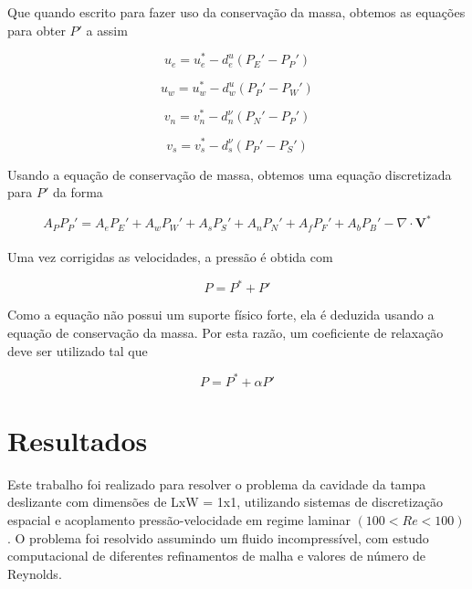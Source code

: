 \documentclass[]{article}
\begin{document}
Que quando escrito para fazer uso da conservação da massa, obtemos as equações para obter $P'$ a assim

\begin{equation}
	u_e = u_e^* - d_e^u \left( P_E' - P_P' \right)
\end{equation}

\begin{equation}
	u_w = u_w^* - d_w^u \left( P_P' - P_W' \right)
\end{equation}

\begin{equation}
	v_n = v_n^* - d_n^\nu \left( P_N' - P_P' \right)
\end{equation}

\begin{equation}
	v_s = v_s^* - d_s^\nu \left( P_P' - P_S' \right)
\end{equation}

Usando a equação de conservação de massa, obtemos uma equação discretizada para $P'$ da forma

\begin{equation}
	A_P P_P' = A_e P_E' + A_w P_W' + A_s P_S' + A_n P_N' + A_f P_F' + A_b P_B' - \nabla \cdot \mathbf{V}^*
\end{equation}\\

Uma vez corrigidas as velocidades, a pressão é obtida com

\begin{equation}
	P = P^{*} + P'
\end{equation}

Como a equação não possui um suporte físico forte, ela é deduzida usando a equação de conservação da massa. Por esta razão, um coeficiente de relaxação deve ser utilizado tal que

\begin{equation}
	P = P^{*} + \alpha P'
\end{equation}


\section*{Resultados}

Este trabalho foi realizado para resolver o problema da cavidade da tampa deslizante com dimensões de LxW = 1x1, utilizando sistemas de discretização espacial e acoplamento pressão-velocidade em regime laminar $(100 < Re < 100)$. O problema foi resolvido assumindo um fluido incompressível, com estudo computacional de diferentes refinamentos de malha e valores de número de Reynolds.\\
\end{document}
